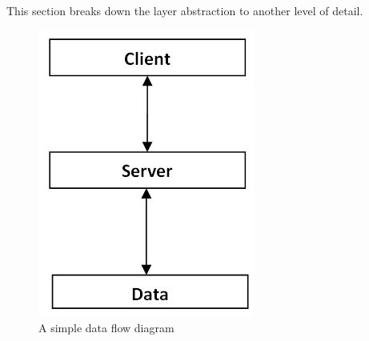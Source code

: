 This section breaks down the layer abstraction to another level of detail. 

\begin{figure}[h!]
	\centering
 	\includegraphics[width=\textwidth]{images/LayerBlockDiagram}
 \caption{A simple data flow diagram}
\end{figure}

